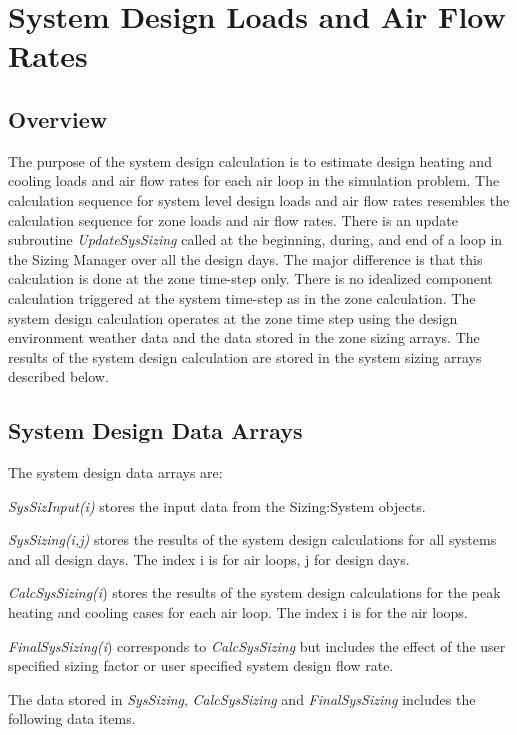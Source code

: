 \section{System Design Loads and Air Flow Rates}\label{system-design-loads-and-air-flow-rates}

\subsection{Overview}\label{overview-026}

The purpose of the system design calculation is to estimate design heating and cooling loads and air flow rates for each air loop in the simulation problem. The calculation sequence for system level design loads and air flow rates resembles the calculation sequence for zone loads and air flow rates. There is an update subroutine \emph{UpdateSysSizing} called at the beginning, during, and end of a loop in the Sizing Manager over all the design days. The major difference is that this calculation is done at the zone time-step only. There is no idealized component calculation triggered at the system time-step as in the zone calculation. The system design calculation operates at the zone time step using the design environment weather data and the data stored in the zone sizing arrays. The results of the system design calculation are stored in the system sizing arrays described below.

\subsection{System Design Data Arrays}\label{system-design-data-arrays}

The system design data arrays are:

\emph{SysSizInput(i)} stores the input data from the Sizing:System objects.

\emph{SysSizing(i,j)} stores the results of the system design calculations for all systems and all design days. The index i is for air loops, j for design days.

\emph{CalcSysSizing(i}) stores the results of the system design calculations for the peak heating and cooling cases for each air loop. The index i is for the air loops.

\emph{FinalSysSizing(i}) corresponds to \emph{CalcSysSizing} but includes the effect of the user specified sizing factor or user specified system design flow rate.

The data stored in \emph{SysSizing}, \emph{CalcSysSizing} and \emph{FinalSysSizing} includes the following data items.

